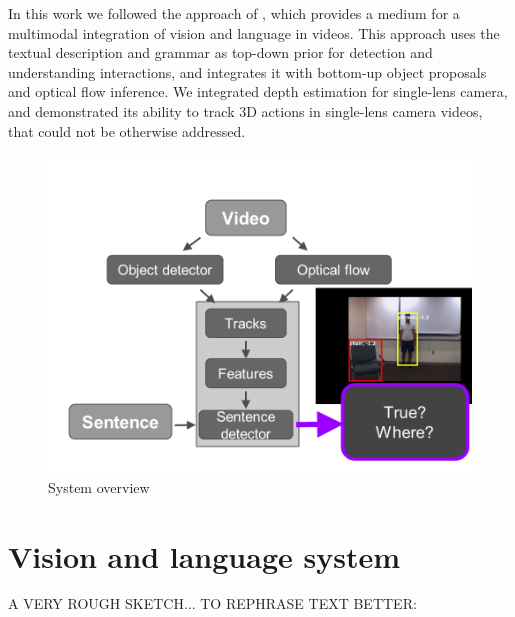 \documentclass[10pt,twocolumn,letterpaper]{article}
\begin{document}
In this work we followed the approach of \cite{siddharth2014seeing}, which provides a medium for a multimodal integration of vision and language in videos. This approach uses the textual description and grammar as top-down prior for detection and understanding interactions, and integrates it with bottom-up object proposals and optical flow inference. We integrated depth estimation \cite{depthfayao} for single-lens camera, and demonstrated its ability to track 3D actions in single-lens camera videos, that could not be otherwise addressed. 



\begin{figure}[ht]
\begin{center}
   \includegraphics[width=0.8\linewidth]{system_overview.png}
\end{center}
   \caption{System overview}
\label{fig_system}
\end{figure}

\section{Vision and language system}


A VERY ROUGH SKETCH... TO REPHRASE TEXT BETTER:
\end{document}
